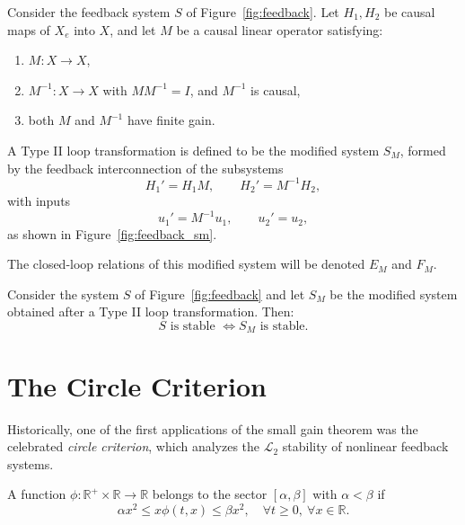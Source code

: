 \begin{definition}
Consider the feedback system $S$ of Figure~\ref{fig:feedback}.  
Let $H_1, H_2$ be causal maps of $X_e$ into $X$, and let $M$ be a causal linear operator satisfying:  

\begin{enumerate}
    \item $M: X \to X$,  
    \item $M^{-1}: X \to X$ with $MM^{-1}=I$, and $M^{-1}$ is causal,  
    \item both $M$ and $M^{-1}$ have finite gain.  
\end{enumerate}

A Type II loop transformation is defined to be the modified system $S_M$, formed by the feedback interconnection of the subsystems
\[
H_1' = H_1 M, \qquad H_2' = M^{-1} H_2,
\]
with inputs
\[
u_1' = M^{-1}u_1, \qquad u_2' = u_2,
\]
as shown in Figure~\ref{fig:feedback_sm}.  

The closed-loop relations of this modified system will be denoted $E_M$ and $F_M$.
\end{definition}

\begin{theorem}
Consider the system $S$ of Figure~\ref{fig:feedback} and let $S_M$ be the modified system obtained after a Type II loop transformation. Then:
\[
S \text{ is stable } \iff S_M \text{ is stable.}
\]
\end{theorem}

\section{The Circle Criterion}

Historically, one of the first applications of the small gain theorem was the celebrated \emph{circle criterion}, which analyzes the $\mathcal{L}_2$ stability of nonlinear feedback systems.  

\begin{definition}
A function $\phi:\mathbb{R}^+\times\mathbb{R}\to\mathbb{R}$ belongs to the sector $[\alpha,\beta]$ with $\alpha<\beta$ if
\begin{equation}
    \alpha x^2 \leq x\phi(t,x) \leq \beta x^2, \quad \forall t\geq 0,\ \forall x\in\mathbb{R}.
\end{equation}
\end{definition}

